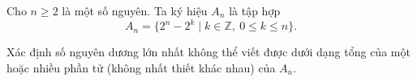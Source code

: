 \ifshowproblem
\begin{problem}\label{example:FRA-2015-TST3-P5}
    Cho $n \geq 2$ là một số nguyên. Ta ký hiệu $A_n$ là tập hợp  
    \[
        A_n = \{2^n - 2^k \mid k \in \mathbb{Z},\ 0 \leq k \leq n\}.
    \]  

    Xác định số nguyên dương lớn nhất không thể viết được dưới dạng tổng của một hoặc nhiều phần tử (không nhất thiết khác nhau) của $A_n$.
\end{problem}
\fi

\fi